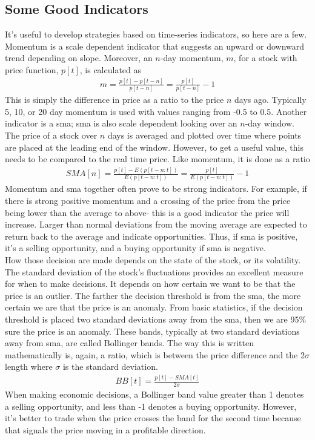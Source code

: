 \subsection{Some Good Indicators}
It's useful to develop strategies based on time-series indicators, so here are a few. Momentum is a scale dependent indicator that suggests an upward or downward trend depending on slope. Moreover, an $n$-day momentum, $m$, for a stock with price function, $p[t]$, is calculated as
\begin{align*}
m=\frac{p[t]-p[t-n]}{p[t-n]}=\frac{p[t]}{p[t-n]}-1
\end{align*}
This is simply the difference in price as a ratio to the price $n$ days ago. Typically 5, 10, or 20 day momentum is used with values ranging from -0.5 to 0.5. Another indicator is a \ac{sma}; \ac{sma} is also scale dependent looking over an $n$-day window. The price of a stock over $n$ days is averaged and plotted over time where points are placed at the leading end of the window. However, to get a useful value, this needs to be compared to the real time price. Like momentum, it is done as a ratio
\begin{align*}
{SMA}[n]=\frac{p[t]-E(p[t-n:t])}{E(p[t-n:t])}=\frac{p[t]}{E(p[t-n:t])}-1
\end{align*}
Momentum and \ac{sma} together often prove to be strong indicators. For example, if there is strong positive momentum and a crossing of the price from the price being lower than the average to above- this is a good indicator the price will increase. Larger than normal deviations from the moving average are expected to return back to the average and indicate opportunities. Thus, if \ac{sma} is positive, it's a selling opportunity, and a buying opportunity if \ac{sma} is negative. \\

How those decision are made depends on the state of the stock, or its volatility. The standard deviation of the stock's fluctuations provides an excellent measure for when to make decisions. It depends on how certain we want to be that the price is an outlier. The farther the decision threshold is from the \ac{sma}, the more certain we are that the price is an anomaly. From basic statistics, if the decision threshold is placed two standard deviations away from the \ac{sma}, then we are 95\% sure the price is an anomaly. These bands, typically at two standard deviations away from \ac{sma}, are called Bollinger bands. The way this is written mathematically is, again, a ratio, which is between the price difference and the 2$\sigma$ length where $\sigma$ is the standard deviation.
\begin{align*}
{BB}[t]=\frac{p[t]-{SMA}[t]}{2\sigma}
\end{align*}
When making economic decisions, a Bollinger band value greater than 1 denotes a selling opportunity, and less than -1 denotes a buying opportunity. However, it's better to trade when the price crosses the band for the second time because that signals the price moving in a profitable direction. \\

